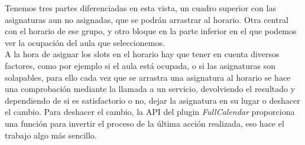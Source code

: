 Tenemos tres partes diferenciadas en esta vista, un cuadro superior con las asignaturas aun no asignadas, que se podrán arrastrar al horario. Otra central con el horario de ese grupo, y otro bloque en la parte inferior en el que podemos ver la ocupación del aula que seleccionemos.\\

A la hora de asignar los slots en el horario hay que tener en cuenta diversos factores, como por ejemplo si el aula está ocupada, o si las asignaturas son solapables, para ello cada vez que se arrastra una asignatura al horario se hace una comprobación mediante la llamada a un servicio, devolviendo el resultado y dependiendo de si es satisfactorio o no, dejar la asignatura en su lugar o deshacer el cambio. Para deshacer el cambio, la API del plugin {\em FullCalendar} proporciona una función para invertir el proceso de la última acción realizada, eso hace el trabajo algo más sencillo.


